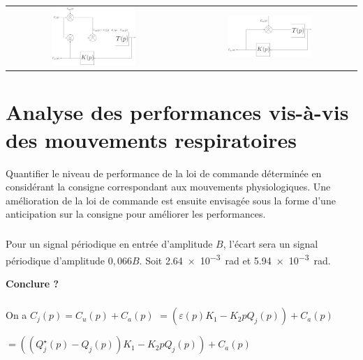 \documentclass[10pt,fleqn]{article} %
\begin{document}
\begin{center}
\begin{tabular}{cc}
\includegraphics[width=0.5\textwidth]{images/DR_B_corrige2.pdf}
&
\includegraphics[width=0.5\textwidth]{images/DR_B_corrige3.pdf}
\end{tabular}
\end{center}

\subparagraph{}%



\subparagraph{}%


\section{Analyse des performances vis-à-vis des mouvements respiratoires}
\begin{obj}
Quantifier le niveau de performance de la loi de commande déterminée en considérant la consigne
correspondant aux mouvements physiologiques. Une amélioration de la loi de commande est ensuite
envisagée sous la forme d’une anticipation sur la consigne pour améliorer les performances.
\end{obj}


\subparagraph{}\textit{}%
Pour un signal périodique en entrée d'amplitude $B$, l'écart sera un signal périodique d'amplitude $0,066B$.  Soit \SI{2,64e-3}{rad} et \SI{5,94e-3}{rad}.

\textbf{Conclure ?}

\subparagraph{}\textit{}%
On a $C_j(p)=C_u(p)+C_a(p)$ 
$=\left(\varepsilon(p)K_1 - K_2 p Q_j(p)\right) + C_a(p) $

$=\left( \left( Q_j^\star (p)-Q_j(p)\right)K_1 - K_2 p Q_j(p)\right) + C_a(p) $
\end{document}
